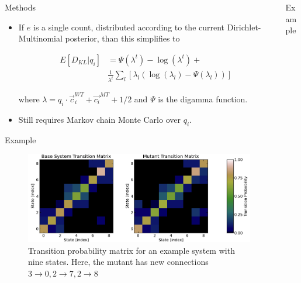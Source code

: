 \documentclass[final]{beamer}
\begin{document}
\begin{frame}{}
\begin{columns}[t]
\begin{column}{.3\linewidth}
\begin{block}{Methods}
\begin{itemize}
\item If $e$ is a single count, distributed according to the current Dirichlet-Multinomial posterior, than this simplifies to

\begin{align*}
E[D_{KL} \vert q_i] &= \Psi(\lambda^t) - \log(\lambda^t) + \\
 &\frac{1}{\lambda^t} \sum_l \left[ \lambda_l \left( \log (\lambda_l) - \Psi(\lambda_l) \right) \right] 
\end{align*}

where $\lambda = q_i \cdot \vec{c}_i^{WT} + \vec{c_i}^{MT} + 1/2$ and $\Psi$ is the digamma function.

\item Still requires Markov chain Monte Carlo over $q_i$.

\end{itemize}
\end{block}
\vspace{0.5in}


\begin{block}{Example}
\end{block}

\begin{figure}
    \centering
 \includegraphics[width=\textwidth]{../code/9x9graph/plots/transition_matrices-tight.png}
    \caption{Transition probability matrix for an example system with nine states. Here, the mutant has new connections $3\rightarrow 0, 2\rightarrow 7, 2\rightarrow 8$}
\end{figure}



\end{column}
\begin{column}{.3\linewidth}

\begin{block}{Example}
\end{block}


\end{column}
\end{columns}
\end{frame}
\end{document}
